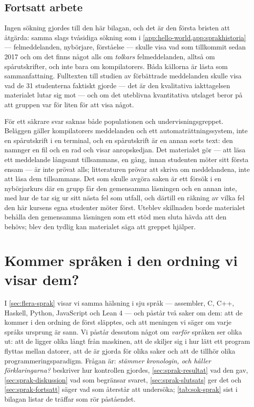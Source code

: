 \section{Fortsatt arbete}
\label{sec:fel-fortsatt}

Ingen sökning gjordes till den här bilagan, och det är den första
bristen att åtgärda: samma slags tvåsidiga sökning som i
\cref{app:hello-world,app:sprakhistoria} --- felmeddelanden, nybörjare,
förståelse --- skulle visa vad som tillkommit sedan 2017 och om det
finns något alls om \emph{tolkars} felmeddelanden, alltså om
spårutskrifter, och inte bara om kompilatorers.  Båda källorna är lästa
som sammanfattning\autocite{Prather2017CEM,Jeffries2022Hello}.
Fulltexten till studien av förbättrade meddelanden skulle visa vad de
31 studenterna faktiskt gjorde --- det är den kvalitativa
iakttagelsen materialet lutar sig mot --- och om det uteblivna
kvantitativa utslaget beror på att gruppen var för liten för att visa
något.

För ett säkrare svar saknas både populationen och undervisningsgreppet.
Beläggen gäller kompilatorers meddelanden och ett automaträttningssystem,
inte en spårutskrift i en terminal, och en spårutskrift är en annan
sorts text: den namnger en fil och en rad och visar anropskedjan.  Det
materialet gör --- att läsa ett meddelande långsamt tillsammans, en
gång, innan studenten möter sitt första ensam --- är inte prövat alls;
litteraturen prövar att skriva om meddelandena, inte att läsa dem
tillsammans.  Det som skulle avgöra saken är ett försök i en
nybörjarkurs där en grupp får den gemensamma läsningen och en annan
inte, med hur de tar sig ur sitt nästa fel som utfall, och därtill en
räkning av vilka fel den här kursens egna studenter möter först.
Uteblev skillnaden borde materialet behålla den gemensamma läsningen som
ett stöd men sluta hävda att den behövs; blev den tydlig kan materialet
säga att greppet hjälper.

\chapter{Kommer språken i den ordning vi visar dem?}
\label{app:sprakhistoria}

I \cref{sec:flera-sprak} visar vi samma hälsning i
sju språk --- assembler, C, C++, Haskell, Python, JavaScript och Lean 4 ---
och påstår två saker om dem: att de kommer i den ordning de först släpptes,
och att meningen vi säger om varje språks ursprung är sann.  Vi påstår
dessutom något om \emph{varför} språken ser olika ut: att de ligger olika
långt från maskinen, att de skiljer sig i hur lätt ett program flyttas
mellan datorer, att de är gjorda för olika saker och att de tillhör olika
programmeringsparadigm.  Frågan är: \emph{stämmer kronologin, och håller
förklaringarna?}   beskriver hur kontrollen gjordes,
\cref{sec:sprak-resultat} vad den gav, \cref{sec:sprak-diskussion} vad som
begränsar svaret, \cref{sec:sprak-slutsats} ger det och
\cref{sec:sprak-fortsatt} säger vad som återstår att undersöka;
\cref{tab:sok-sprak} sist i bilagan listar de träffar som rör påståendet.


